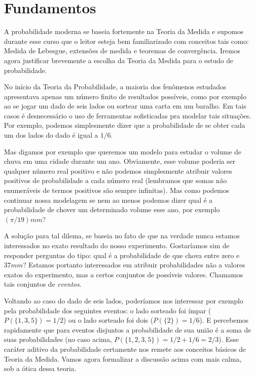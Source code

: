 \chapter{Fundamentos}

A probabilidade moderna se baseia fortemente na Teoria da Medida e supomos durante esse curso que o leitor esteja bem familiarizado com conceitos tais como: Medida de Lebesgue, extensões de medida e teoremas de convergência.
Iremos agora justificar brevemente a escolha da Teoria da Medida para o estudo de probabilidade.

No início da Teoria da Probabilidade, a maioria dos fenômenos estudados apresentava apenas um número finito de resultados possíveis, como por exemplo ao se jogar um dado de seis lados ou sortear uma carta em um baralho.
Em tais casos é desnecessário o uso de ferramentas sofisticadas pra modelar tais situações.
Por exemplo, podemos simplesmente dizer que a probabilidade de se obter cada um dos lados do dado é igual a $1/6$.

Mas digamos por exemplo que queremos um modelo para estudar o volume de chuva em uma cidade durante um ano.
Obviamente, esse volume poderia ser qualquer número real positivo e não podemos simplesmente atribuir valores positivos de probabilidade a cada número real (lembramos que somas não enumeráveis de termos positivos são sempre infinitas).
Mas como podemos continuar nossa modelagem se nem ao menos podemos dizer qual é a probabilidade de chover um determinado volume esse ano, por exemplo $(\pi/19)mm$?

A solução para tal dilema, se baseia no fato de que na verdade nunca estamos interessados no exato resultado do nosso experimento.
Gostaríamos sim de responder perguntas do tipo: qual é a probabilidade de que chova entre zero e $37mm$?
Estamos portanto interessados em atribuir probabilidades não a valores exatos do experimento, mas a certos conjuntos de possíveis valores.
Chamamos tais conjuntos de \emph{eventos}. 

Voltando ao caso do dado de seis lados, poderíamos nos interessar por exemplo pela probabilidade dos seguintes eventos: o lado sorteado foi ímpar ($P(\{1,3,5\}) = 1/2$) ou o lado sorteado foi dois ($P(\{2\}) = 1/6$).
E percebemos rapidamente que para eventos disjuntos a probabilidade de sua união é a soma de suas probabilidades (no caso acima, $P(\{1,2,3,5\}) = 1/2 + 1/6 = 2/3$).
Esse caráter aditivo da probabilidade certamente nos remete aos conceitos básicos de Teoria da Medida.
Vamos agora formalizar a discussão acima com mais calma, sob a ótica dessa teoria.

